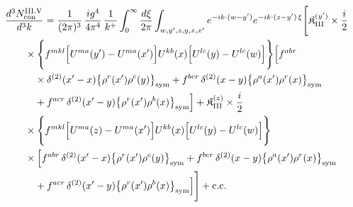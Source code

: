 \begingroup\small
\begin{align}\label{eq:H-III.V-2}
&\frac{d^{3}N^{\rm III.V}_{{\rm con}}}{d^{3}k}=\frac{1}{(2\pi)^{3}}\, \frac{ig^{4}}{4\pi^{4}}\, \frac{1}{k^{+}} \int_{0}^{\infty}\frac{d\xi}{2\pi} \int_{w,y',z,y,x,x'}e^{-ik\cdot(w-y')}e^{-ik\cdot(z-y')\,\xi}\Bigg[ \mathfrak{K}^{(y')}_{\rm III} \times \frac{i}{2}\notag\\
&\quad\quad \times \Bigg\{f^{mkl}\Big[U^{ma}(y')-U^{ma}(x')\Big]U^{kb}(x)\Big[U^{lc}(y)-U^{lc}(w)\Big]\Bigg\}\Big[f^{abr}\notag\\
&\quad\quad\quad \times \delta^{(2)}(x'-x)\big\{\rho^{r}(x')\rho^{c}(y)\big\}_{\rm sym} +f^{bcr}\, \delta^{(2)}(x-y)\big\{\rho^{a}(x')\rho^{r}(x)\big\}_{\rm sym}\notag\\
&\quad\quad\quad +f^{acr}\, \delta^{(2)}(x'-y)\big\{\rho^{r}(x')\rho^{b}(x)\big\}_{\rm sym}\Big] + \mathfrak{K}^{(z)}_{\rm III} \times \frac{i}{2}\notag\\
&\quad\quad \times \Bigg\{f^{mkl}\Big[U^{ma}(z)-U^{ma}(x')\Big]U^{kb}(x)\Big[U^{lc}(y)-U^{lc}(w)\Big]\Bigg\}\notag\\
&\quad\quad \times \Big[f^{abr}\, \delta^{(2)}(x'-x)\big\{\rho^{r}(x')\rho^{c}(y)\big\}_{\rm sym} +f^{bcr}\, \delta^{(2)}(x-y)\big\{\rho^{a}(x')\rho^{r}(x)\big\}_{\rm sym}\notag\\
&\quad\quad\quad +f^{acr}\, \delta^{(2)}(x'-y)\big\{\rho^{r}(x')\rho^{b}(x)\big\}_{\rm sym}\Big]\Bigg] +{\rm c.c.}
\end{align}
\endgroup
